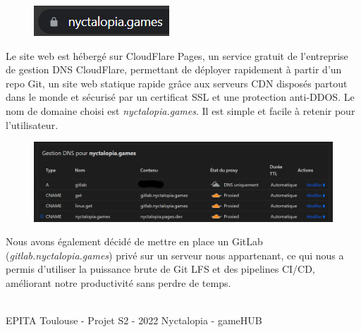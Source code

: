 
\begin{figure}[H]
\centering
\begin{minipage}{.5\textwidth}
  \centering
  \centerline{\includegraphics[width=1.5\linewidth]{img/ssl.png}}
  \label{fig:dns}
\end{minipage}%
\end{figure}

Le site web est hébergé sur CloudFlare Pages, un service gratuit de l'entreprise de gestion DNS CloudFlare, permettant de déployer rapidement à partir d'un repo Git, un site web statique rapide grâce aux serveurs CDN disposés partout dans le monde et sécurisé par un certificat SSL et une protection anti-DDOS.
Le nom de domaine choisi est \emph{nyctalopia.games}. Il est simple et facile à retenir pour l'utilisateur.

\begin{figure}[H]
\centering
\begin{minipage}{.5\textwidth}
  \centering
  \centerline{\includegraphics[width=2\linewidth]{img/ui/dns.png}}
  \label{fig:dns}
\end{minipage}%
\end{figure}

Nous avons également décidé de mettre en place un GitLab (\emph{gitlab.nyctalopia.games}) privé sur un serveur nous appartenant, ce qui nous a permis d'utiliser la puissance brute de Git LFS et des pipelines CI/CD, améliorant notre productivité sans perdre de temps.

\vfill
\noindent\makebox[\linewidth]{\rule{.8\paperwidth}{.6pt}}\\[0.2cm]
EPITA Toulouse - Projet S2 - 2022 \hfill Nyctalopia - gameHUB
\noindent\makebox[\linewidth]{\rule{.8\paperwidth}{.6pt}}

\newpage